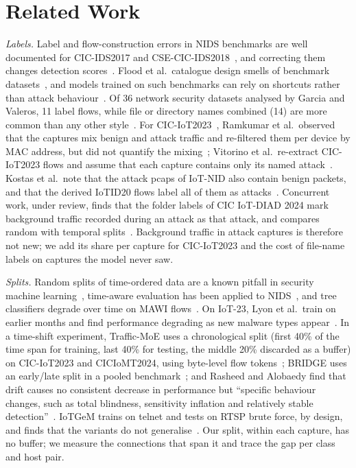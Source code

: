 \section{Related Work}\label{sec:related}

\emph{Labels.} Label and flow-construction errors in NIDS benchmarks are well documented for CIC-IDS2017 and CSE-CIC-IDS2018~\cite{engelen2021troubleshooting,liu2022error}, and correcting them changes detection scores~\cite{lanvin2023errors}. Flood et al.\ catalogue design smells of benchmark datasets~\cite{flood2024smells}, and models trained on such benchmarks can rely on shortcuts rather than attack behaviour~\cite{jacobs2022emperor}. Of 36 network security datasets analysed by Garcia and Valeros, 11 label flows, while file or directory names combined (14) are more common than any other style~\cite{garcia2023labeling}. For CIC-IoT2023~\cite{neto2023ciciot2023}, Ramkumar et al.\ observed that the captures mix benign and attack traffic and re-filtered them per device by MAC address, but did not quantify the mixing~\cite{ramkumar2024diagnosing}; Vitorino et al.\ re-extract CIC-IoT2023 flows and assume that each capture contains only its named attack~\cite{vitorino2025revisiting}. Kostas et al.\ note that the attack pcaps of IoT-NID also contain benign packets, and that the derived IoTID20 flows label all of them as attacks~\cite[App.~A.3]{kostas2024iotgem}. Concurrent work, under review, finds that the folder labels of CIC IoT-DIAD 2024 mark background traffic recorded during an attack as that attack, and compares random with temporal splits~\cite{fadel2026diad}. Background traffic in attack captures is therefore not new; we add its share per capture for CIC-IoT2023 and the cost of file-name labels on captures the model never saw.

\emph{Splits.} Random splits of time-ordered data are a known pitfall in security machine learning~\cite{arp2022dos,pendlebury2019tesseract,apruzzese2023sok}, time-aware evaluation has been applied to NIDS~\cite{andresini2021insomnia}, and tree classifiers degrade over time on MAWI flows~\cite{schraven2026mawiflow}. On IoT-23, Lyon et al.\ train on earlier months and find performance degrading as new malware types appear~\cite{lyon2026iot23drift}. In a time-shift experiment, Traffic-MoE uses a chronological split (first 40\% of the time span for training, last 40\% for testing, the middle 20\% discarded as a buffer) on CIC-IoT2023 and CICIoMT2024, using byte-level flow tokens~\cite{zhou2026trafficmoe}; BRIDGE uses an early/late split in a pooled benchmark~\cite{bridge2026tchnet}; and Rasheed and Alobaedy find that drift causes no consistent decrease in performance but ``specific behaviour changes, such as total blindness, sensitivity inflation and relatively stable detection''~\cite{rasheed2026drift}. IoTGeM trains on telnet and tests on RTSP brute force, by design, and finds that the variants do not generalise~\cite{kostas2024iotgem}. Our split, within each capture, has no buffer; we measure the connections that span it and trace the gap per class and host pair.


